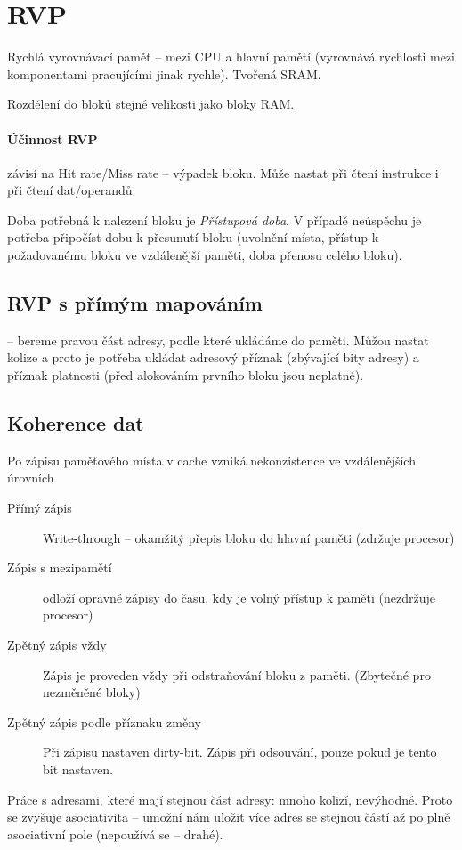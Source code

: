 \documentclass[a4paper, 11pt]{report}
\begin{document}
\section{RVP} Rychlá vyrovnávací paměť -- mezi CPU a hlavní pamětí (vyrovnává rychlosti mezi komponentami pracujícími jinak rychle). Tvořená SRAM.

Rozdělení do bloků stejné velikosti jako bloky RAM.

\paragraph{Účinnost RVP} závisí na Hit rate/Miss rate -- výpadek bloku. Může nastat při čtení instrukce i při čtení dat/operandů.

Doba potřebná k nalezení bloku je \emph{Přístupová doba}. V případě neúspěchu je potřeba připočíst dobu k přesunutí bloku (uvolnění místa, přístup k požadovanému bloku ve vzdálenější paměti, doba přenosu celého bloku).

\subsection{RVP s přímým mapováním} -- bereme pravou část adresy, podle které ukládáme do paměti. Můžou nastat kolize a proto je potřeba ukládat adresový příznak (zbývající bity adresy) a příznak platnosti (před alokováním prvního bloku jsou neplatné).

\subsection{Koherence dat}
Po zápisu paměťového místa v cache vzniká nekonzistence ve vzdálenějších úrovních
\begin{description}
	\item[Přímý zápis] Write-through -- okamžitý přepis bloku do hlavní paměti (zdržuje procesor)
	\item[Zápis s mezipamětí] odloží opravné zápisy do času, kdy je volný přístup k paměti (nezdržuje procesor)
	\item[Zpětný zápis vždy] Zápis je proveden vždy při odstraňování bloku z paměti. (Zbytečné pro nezměněné bloky)
	\item[Zpětný zápis podle příznaku změny] Při zápisu nastaven dirty-bit. Zápis při odsouvání, pouze pokud je tento bit nastaven.
\end{description}

Práce s adresami, které mají stejnou část adresy: mnoho kolizí, nevýhodné. Proto se zvyšuje asociativita -- umožní nám uložit více adres se stejnou částí až po plně asociativní pole (nepoužívá se -- drahé).
\end{document}
